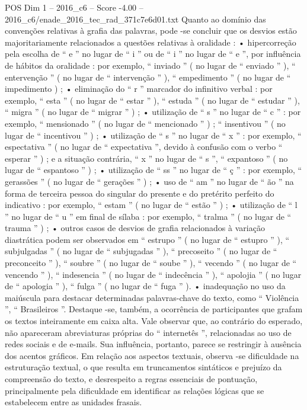 \begin{textsample}{POS Dim 1 – 2016\_c6 – Score -4.00 – 2016\_c6/enade\_2016\_tec\_rad\_371c7e6d01.txt}
Quanto ao domínio das convenções relativas à grafia das palavras, pode -se concluir que os desvios estão majoritariamente relacionados a questões relativas à oralidade : • hipercorreção pela escolha de “ e ” no lugar de “ i ” ou de “ i ” no lugar de “ e ”, por influência de hábitos da oralidade : por exemplo, “ inviado ” ( no lugar de “ enviado ” ), “ entervenção ” ( no lugar de “ intervenção ” ), “ empedimento ” ( no lugar de “ impedimento ) ; • eliminação do “ r ” marcador do infinitivo verbal : por exemplo, “ esta ” ( no lugar de “ estar ” ), “ estuda ” ( no lugar de “ estudar ” ), “ migra ” ( no lugar de “ migrar ” ) ; • utilização de “ s ” no lugar de “ c ” : por exemplo, “ mensionado ” ( no lugar de “ mencionado ” ) ; “ insentivou ” ( no lugar de “ incentivou ” ) ; • utilização de “ s ” no lugar de “ x ” : por exemplo, “ espectativa ” ( no lugar de “ expectativa ”, devido à confusão com o verbo “ esperar ” ) ; e a situação contrária, “ x ” no lugar de “ s ”, “ expantoso ” ( no lugar de “ espantoso ” ) ; • utilização de “ ss ” no lugar de “ ç ” : por exemplo, “ gerassões ” ( no lugar de “ gerações ” ) ; • uso de “ am ” no lugar de “ ão ” na forma de terceira pessoa do singular do presente e do pretérito perfeito do indicativo : por exemplo, “ estam ” ( no lugar de “ estão ” ) ; • utilização de “ l ” no lugar de “ u ” em final de sílaba : por exemplo, “ tralma ” ( no lugar de “ trauma ” ) ; • outros casos de desvios de grafia relacionados à variação diastrática podem ser observados em “ estrupo ” ( no lugar de “ estupro ” ), “ subjulgadas ” ( no lugar de “ subjugadas ” ), “ precoseito ” ( no lugar de “ preconceito ” ), “ soubre ” ( no lugar de “ soube ” ), “ vecendo ” ( no lugar de “ vencendo ” ), “ indesencia ” ( no lugar de “ indecência ” ), “ apolojia ” ( no lugar de “ apologia ” ), “ fulga ” ( no lugar de “ fuga ” ). • inadequação no uso da maiúscula para destacar determinadas palavras-chave do texto, como “ Violência ”, “ Brasileiros ”.
Destaque -se, também, a ocorrência de participantes que grafam os textos inteiramente em caixa alta.
Vale observar que, ao contrário do esperado, não apareceram abreviaturas próprias do “ internetês ”, relacionadas ao uso de redes sociais e de e-mails.
Sua influência, portanto, parece se restringir à ausência dos acentos gráficos.
Em relação aos aspectos textuais, observa -se dificuldade na estruturação textual, o que resulta em truncamentos sintáticos e prejuízo da compreensão do texto, e desrespeito a regras essenciais de pontuação, principalmente pela dificuldade em identificar as relações lógicas que se estabelecem entre as unidades frasais.

\end{textsample}
